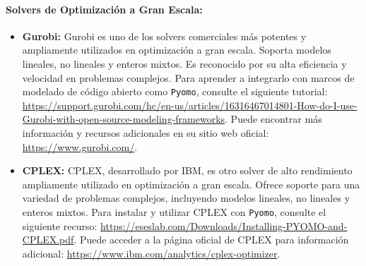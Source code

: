 \documentclass[12pt]{article}
\begin{document}
\paragraph{Solvers de Optimización a Gran Escala:}
\begin{itemize}
    \item \textbf{Gurobi:} Gurobi es uno de los solvers comerciales más potentes y ampliamente utilizados en optimización a gran escala. Soporta modelos lineales, no lineales y enteros mixtos. Es reconocido por su alta eficiencia y velocidad en problemas complejos. Para aprender a integrarlo con marcos de modelado de código abierto como \texttt{Pyomo}, consulte el siguiente tutorial: \url{https://support.gurobi.com/hc/en-us/articles/16316467014801-How-do-I-use-Gurobi-with-open-source-modeling-frameworks}. Puede encontrar más información y recursos adicionales en su sitio web oficial: \url{https://www.gurobi.com/}.
    
    \item \textbf{CPLEX:} CPLEX, desarrollado por IBM, es otro solver de alto rendimiento ampliamente utilizado en optimización a gran escala. Ofrece soporte para una variedad de problemas complejos, incluyendo modelos lineales, no lineales y enteros mixtos. Para instalar y utilizar CPLEX con \texttt{Pyomo}, consulte el siguiente recurso: \url{https://eseslab.com/Downloads/Installing-PYOMO-and-CPLEX.pdf}. Puede acceder a la página oficial de CPLEX para información adicional: \url{https://www.ibm.com/analytics/cplex-optimizer}.


\end{itemize}
\end{document}
